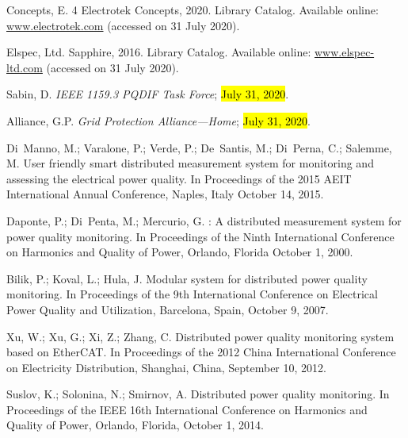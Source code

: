 \documentclass[energies,article,accept,moreauthors,pdftex]{Definitions/mdpi}
\begin{document}
\begin{thebibliography}{999}
Concepts, E.
 4 {\textbar} {Electrotek} {Concepts}, 2020.
\newblock Library Catalog. Available online:  \url{www.electrotek.com}  (accessed on 31 July 2020).

{Elspec, Ltd}.
 {Sapphire}, 2016.
\newblock Library Catalog. Available online:  \url{www.elspec-ltd.com}  (accessed on 31 July 2020).

Sabin, D.
\newblock \emph{{IEEE} 1159.3 {PQDIF} {Task} {Force}}; \hl{July 31, 2020}.

Alliance, G.P.
\newblock \emph{Grid {Protection} {Alliance}---{Home}}; \hl{July 31, 2020}.

Di~Manno, M.; Varalone, P.; Verde, P.; De~Santis, M.; Di~Perna, C.; Salemme, M.
\newblock User friendly smart distributed measurement system for monitoring and
assessing the electrical power quality.
\newblock In Proceedings of the 2015 {AEIT} {International} {Annual}
{Conference}, Naples, Italy October 14, 2015.

Daponte, P.; Di~Penta, M.; Mercurio, G.
: A distributed measurement system for power quality
monitoring.
\newblock In {Proceedings of the } Ninth {International} {Conference} on {Harmonics} and {Quality} of
{Power}, Orlando, Florida October 1, 2000.

Bilik, P.; Koval, L.; Hula, J.
\newblock Modular system for distributed power quality monitoring.
\newblock In {Proceedings of the } 9th {International} {Conference} on {Electrical} {Power} {Quality}
and {Utilization}, Barcelona, Spain, October 9, 2007.

Xu, W.; Xu, G.; Xi, Z.; Zhang, C.
\newblock Distributed power quality monitoring system based on {EtherCAT}.
\newblock In {Proceedings of the }2012 {China} {International} {Conference} on {Electricity}
{Distribution}, Shanghai, China, September 10, 2012.

Suslov, K.; Solonina, N.; Smirnov, A.
\newblock Distributed power quality monitoring.
\newblock In {Proceedings of the } {IEEE} 16th {International} {Conference} on {Harmonics} and
{Quality} of {Power}, Orlando, Florida, October 1, 2014.


\end{thebibliography}
\end{document}
